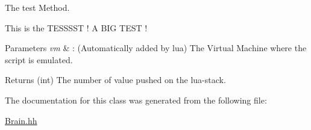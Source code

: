 The test Method. 

This is the TESSSST ! A BIG TEST !


\begin{DoxyParams}{Parameters}
{\em vm} & : (Automatically added by lua) The Virtual Machine where the script is emulated. \\
\hline
\end{DoxyParams}
\begin{DoxyReturn}{Returns}
(int) The number of value pushed on the lua-\/stack. 
\end{DoxyReturn}


The documentation for this class was generated from the following file:\begin{DoxyCompactItemize}
\item 
\hyperlink{Brain_8hh}{Brain.hh}\end{DoxyCompactItemize}
